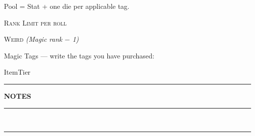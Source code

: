 \begin{minipage}[t]{0.31\linewidth}

  {\scriptsize\color{atrRule}Pool = Stat + one die per applicable tag.}
  \par\vspace{2pt}
  {\small\textsc{Rank}}\hspace{3mm}\sheetfourpips
  \hfill{\small\textsc{Limit per roll}}\ \underline{\hspace{8mm}}
  \par\vspace{4pt}
  {\small\textsc{Weird}}\hspace{3mm}\underline{\hspace{8mm}}
  \hfill{\scriptsize\itshape\color{atrRule}(Magic rank $-$ 1)}
  \par\vspace{6pt}
  {\scriptsize\color{atrRule}Magic Tags — write the tags you have purchased:}
  \par\vspace{4pt}
  \sheettagslot[40mm]\par\vspace{3pt}
  \sheettagslot[40mm]\par\vspace{3pt}
  \sheettagslot[40mm]\par\vspace{3pt}
  \sheettagslot[40mm]\par\vspace{3pt}
  \sheettagslot[40mm]\par\vspace{3pt}
  \sheettagslot[40mm]\par\vspace{3pt}
  \sheettagslot[40mm]\par\vspace{3pt}
  \sheettagslot[40mm]\par\vspace{3pt}
  \sheettagslot[40mm]\par\vspace{3pt}
  \sheettagslot[40mm]
  \par\vspace{6pt}

  {\scriptsize Item\hfill Tier}\par\vspace{2pt}
  \sheetitemrow\sheetitemrow\sheetitemrow\sheetitemrow\sheetitemrow
  \sheetitemrow\sheetitemrow\sheetitemrow

\end{minipage}

\par\vspace{4pt}
{\color{atrRule}\rule{\linewidth}{0.5pt}}\par\vspace{1pt}
{\hdfont\bfseries\footnotesize\color{atrAccent}NOTES}\hspace{4mm}%
\rule{0.85\linewidth}{0.3pt}\\[6pt]
\rule{\linewidth}{0.3pt}
